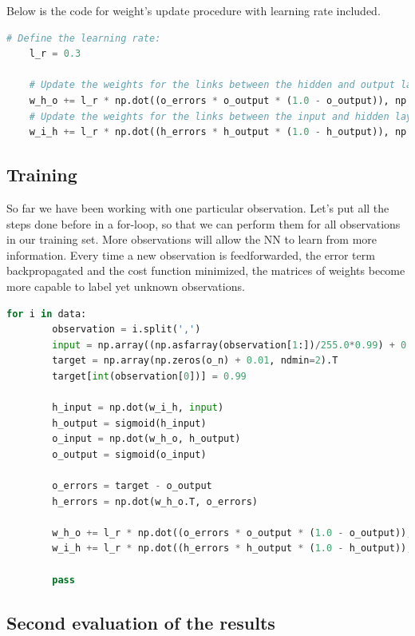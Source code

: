 Below is the code for weight's update procedure with learning rate included.

\begin{lstlisting}[language=Python]
    # Define the learning rate:
    l_r = 0.3

    # Update the weights for the links between the hidden and output layers:
    w_h_o += l_r * np.dot((o_errors * o_output * (1.0 - o_output)), np.transpose(h_output))
    # Update the weights for the links between the input and hidden layers:
    w_i_h += l_r * np.dot((h_errors * h_output * (1.0 - h_output)), np.transpose(input))
\end{lstlisting}

\subsection{Training}

So far we have been working with one particular observation. Let's put all the steps done before in a for-loop, so that we can perform them for all observations in our training set. More observations will allow the NN to learn from more information. Every time a new observation is feedforwarded, the error term backpropagated and the cost function minimized, the matrices of weights become more capable to label yet unknown observations.

\begin{lstlisting}[language=Python]
    for i in data:
        observation = i.split(',')
        input = np.array((np.asfarray(observation[1:])/255.0*0.99) + 0.01, ndmin=2).T
        target = np.array(np.zeros(o_n) + 0.01, ndmin=2).T
        target[int(observation[0])] = 0.99
    
        h_input = np.dot(w_i_h, input)
        h_output = sigmoid(h_input)
        o_input = np.dot(w_h_o, h_output)
        o_output = sigmoid(o_input)
    
        o_errors = target - o_output
        h_errors = np.dot(w_h_o.T, o_errors)
        
        w_h_o += l_r * np.dot((o_errors * o_output * (1.0 - o_output)), np.transpose(h_output))
        w_i_h += l_r * np.dot((h_errors * h_output * (1.0 - h_output)), np.transpose(input))
    
        pass
\end{lstlisting}

\subsection{Second evaluation of the results}
   
